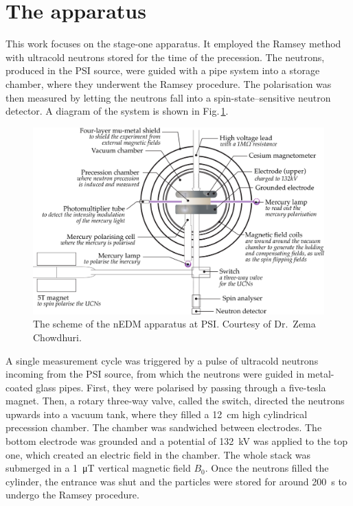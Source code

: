 \section{The apparatus}
This work focuses on the stage-one apparatus.
It employed the Ramsey method with ultracold neutrons stored for the time of the precession.
The neutrons, produced in the PSI source, were guided with a pipe system into a storage chamber, where they underwent the Ramsey procedure.
The polarisation was then measured by letting the neutrons fall into a spin-state--sensitive neutron detector.
A diagram of the system is shown in Fig.\,\ref{fig:nEDM_scheme}.

\begin{figure}
  \centering
  \includegraphics[width=\linewidth]{gfx/nEDMatPSI/apparatus_palatino.pdf}
  \caption{The scheme of the nEDM apparatus at PSI\@. Courtesy of Dr.\ Zema Chowdhuri.}\label{fig:nEDM_scheme}
\end{figure}

A single measurement cycle was triggered by a pulse of ultracold neutrons incoming from the PSI source, from which the neutrons were guided in metal-coated glass pipes.
First, they were polarised by passing through a five-tesla magnet.
Then, a rotary three-way valve, called the switch, directed the neutrons upwards into a vacuum tank, where they filled a \SI{12}{\centi\meter} high cylindrical precession chamber.
The chamber was sandwiched between electrodes. The bottom electrode was grounded and a potential of \SI{132}{\kilo\volt} was applied to the top one, which created an electric field in the chamber.
The whole stack was submerged in a \SI{1}{\micro\tesla} vertical magnetic field $B_0$.
Once the neutrons filled the cylinder, the entrance was shut and the particles were stored for around \SI{200}{\second} to undergo the Ramsey procedure.

